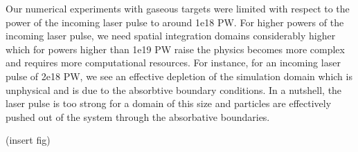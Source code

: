 \documentclass[12pt, class=report, crop=false]{standalone}
\begin{document}
Our numerical experiments with gaseous targets were limited with
respect to the power of the incoming laser pulse to around
1e18 PW. For higher powers of the incoming laser pulse, we need
spatial integration domains considerably higher which for powers
higher than 1e19 PW raise the physics becomes more complex and
requires more computational resources. For instance, for an
incoming laser pulse of 2e18 PW, we see an effective depletion
of the simulation domain which is unphysical and is due to the
absorbtive boundary conditions. In a nutshell, the laser pulse is
too strong for a domain of this size and particles are effectively
pushed out of the system through the absorbative boundaries.

(insert fig)
\end{document}
